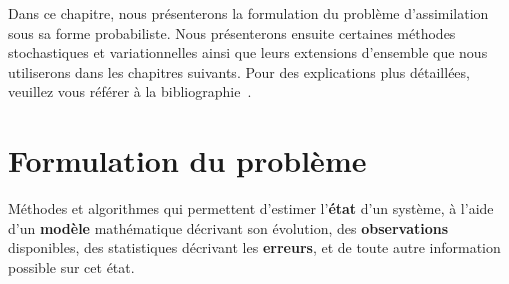 Dans ce chapitre, nous présenterons la formulation du problème d'assimilation sous sa forme probabiliste. Nous présenterons ensuite certaines méthodes stochastiques et variationnelles ainsi que leurs extensions d'ensemble que nous utiliserons dans les chapitres suivants. Pour des explications plus détaillées, veuillez vous référer à la bibliographie~\cite{law_data_2015,asch_data_2016,evensen_data_2022}.


\section{Formulation du problème}

\begin{definition}
    Méthodes et algorithmes qui permettent d’estimer l’\textbf{état} d’un système, à l’aide d’un \textbf{modèle} mathématique décrivant son évolution, des \textbf{observations} disponibles, des statistiques décrivant les \textbf{erreurs}, et de toute autre information possible sur cet état.
\end{definition}


